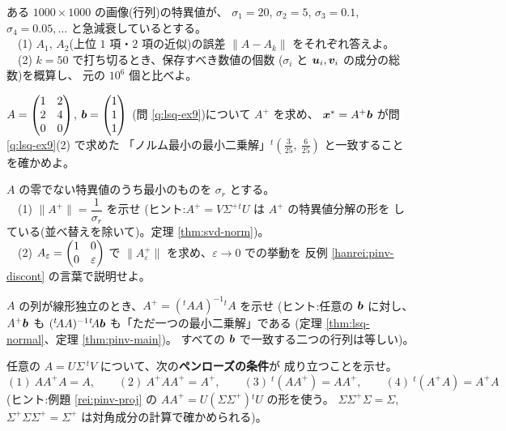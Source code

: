 \begin{mondai}[標準]\label{q:pinv-ex8}
ある $1000 \times 1000$ の画像(行列)の特異値が、
$\sigma_1 = 20$, $\sigma_2 = 5$, $\sigma_3 = 0.1$,
$\sigma_4 = 0.05, \dots$ と急減衰しているとする。\\
　(1) $A_1$, $A_2$(上位 $1$ 項・$2$ 項の近似)の誤差
$\|A - A_k\|$ をそれぞれ答えよ。\\
　(2) $k = 50$ で打ち切るとき、保存すべき数値の個数
($\sigma_i$ と $\bm{u}_i, \bm{v}_i$ の成分の総数)を概算し、
元の $10^6$ 個と比べよ。
\end{mondai}

\begin{mondai}[発展]\label{q:pinv-ex9}
$A = \begin{pmatrix}1 & 2 \\ 2 & 4 \\ 0 & 0\end{pmatrix}$, $\bm{b} = \begin{pmatrix}1 \\ 1 \\ 1\end{pmatrix}$
(問 \ref{q:lsq-ex9})について $A^{+}$ を求め、
$\bm{x}^* = A^{+}\bm{b}$ が問 \ref{q:lsq-ex9}(2) で求めた
「ノルム最小の最小二乗解」${}^t\!\left(\frac{3}{25},\ \frac{6}{25}\right)$
と一致することを確かめよ。
\end{mondai}

\begin{mondai}[発展]\label{q:pinv-ex10}
$A$ の零でない特異値のうち最小のものを $\sigma_r$ とする。\\
　(1) $\|A^{+}\| = \dfrac{1}{\sigma_r}$ を示せ
(ヒント:$A^{+} = V\Sigma^{+}{}^tU$ は $A^{+}$ の特異値分解の形を
している(並べ替えを除いて)。定理 \ref{thm:svd-norm})。\\
　(2) $A_{\varepsilon} = \begin{pmatrix}1 & 0 \\ 0 & \varepsilon\end{pmatrix}$ で
$\|A_{\varepsilon}^{+}\|$ を求め、$\varepsilon \to 0$ での挙動を
反例 \ref{hanrei:pinv-discont} の言葉で説明せよ。
\end{mondai}

\begin{mondai}[証明]\label{q:pinv-ex11}
$A$ の列が線形独立のとき、$A^{+} = ({}^t\!AA)^{-1}{}^t\!A$ を示せ
(ヒント:任意の $\bm{b}$ に対し、$A^{+}\bm{b}$ も
$({}^t\!AA)^{-1}{}^t\!A\bm{b}$ も「ただ一つの最小二乗解」である
(定理 \ref{thm:lsq-normal}、定理 \ref{thm:pinv-main})。
すべての $\bm{b}$ で一致する二つの行列は等しい)。
\end{mondai}

\begin{mondai}[証明]\label{q:pinv-ex12}
任意の $A = U\Sigma\,{}^tV$ について、次の\textbf{ペンローズの条件}が
成り立つことを示せ。
\[
(1)\ AA^{+}A = A, \qquad (2)\ A^{+}AA^{+} = A^{+}, \qquad
(3)\ {}^t(AA^{+}) = AA^{+}, \qquad (4)\ {}^t(A^{+}A) = A^{+}A
\]
(ヒント:例題 \ref{rei:pinv-proj} の
$AA^{+} = U(\Sigma\Sigma^{+}){}^tU$ の形を使う。
$\Sigma\Sigma^{+}\Sigma = \Sigma$, $\Sigma^{+}\Sigma\Sigma^{+} = \Sigma^{+}$
は対角成分の計算で確かめられる)。
\end{mondai}

